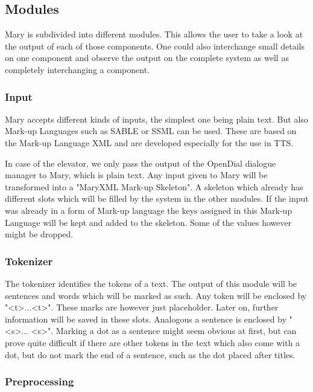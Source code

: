 \documentclass[a4paper, 12pt]{article}
\begin{document}
\subsection{Modules}

Mary is subdivided into different modules. 
This allows the user to take a look at the output of each of those components. 
One could also interchange small details on one component and observe the output on the complete system as well as completely interchanging a component.

\subsubsection*{Input}

Mary accepts different kinds of inputs, the simplest one being plain text.
But also Mark-up Languages such as SABLE or SSML can be used. 
These are based on the Mark-up Language XML and are developed especially for the use in TTS.

In case of the elevator, we only pass the output of the OpenDial dialogue manager to Mary, which is plain text.
Any input given to Mary will be transformed into a "MaryXML Mark-up Skeleton". 
A skeleton which already has different slots which will be filled by the system in the other modules.
If the input was already in a form of Mark-up language the keys assigned in this Mark-up Language will be kept and added to the skeleton. Some of the values however might be dropped.

\subsubsection*{Tokenizer}

The tokenizer identifies the tokens of a text. The output of this module will be sentences and words which will be marked as such.
Any token will be enclosed by "\textless t\textgreater ...\textless  t\textgreater". 
These marks are however just placeholder. 
Later on, further information will be saved in these slots.
Analogous a sentence is enclosed by "\textless s\textgreater ... \textless s\textgreater". 
Marking a dot as a sentence might seem obvious at first, but can prove quite difficult if there are other tokens in the text which also come with a dot, but do not mark the end of a sentence, such as the dot placed after titles.

\subsubsection*{Preprocessing}
\end{document}
